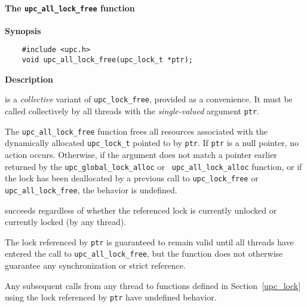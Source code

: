 \np %

\cbstart
\paragraph{The {\tt upc\_all\_lock\_free} function}

{\bf Synopsis}

\npf\vspace{-2.5em}
\begin{verbatim}
    #include <upc.h> 
    void upc_all_lock_free(upc_lock_t *ptr); 
\end{verbatim}

{\bf Description}

 is a {\em collective} variant of {\tt upc\_lock\_free}, provided as a convenience.
    It must be called collectively by all threads with the {\em single-valued} argument {\tt ptr}.

\np The {\tt upc\_all\_lock\_free} function frees all resources
    associated with the dynamically allocated {\tt upc\_lock\_t} pointed to
    by {\tt ptr}.  If {\tt ptr} is a null pointer, no action occurs.
    Otherwise, if the argument does not match a pointer earlier
    returned by the {\tt upc\_global\_lock\_alloc} or {\tt
    upc\_all\_lock\_alloc} function, or if the lock has been
    deallocated by a previous call to {\tt upc\_lock\_free}
    or {\tt upc\_all\_lock\_free}, the behavior is undefined.

 succeeds regardless of whether the
    referenced lock is currently unlocked or currently locked (by any
    thread).

\np The lock referenced by {\tt ptr} is guaranteed to remain valid
    until all threads have entered the call to {\tt upc\_all\_lock\_free}, but the
    function does not otherwise guarantee any synchronization or strict reference.

\np Any subsequent calls from any thread to functions defined in
    Section~\ref{upc_lock} using the lock referenced by {\tt ptr} have
    undefined behavior. 


